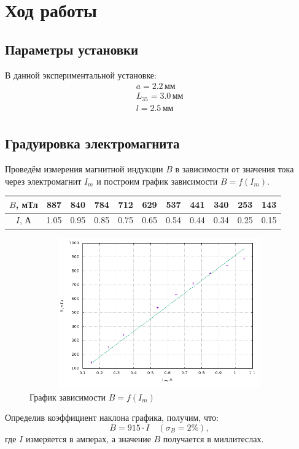 \documentclass[12pt]{article}
\begin{document}
\section*{Ход работы}
\subsection*{Параметры установки}
	В данной экспериментальной установке:
	\begin{align*}
		a = 2.2 \, \text{мм} \\
		L_\text{35} = 3.0 \, \text{мм} \\
		l = 2.5 \, \text{мм} \\ 
	\end{align*}
\subsection*{Градуировка электромагнита}
	Проведём измерения магнитной индукции $B$ в зависимости от значения тока через электромагнит $I_m$ и построим график зависимости $B = f(I_m)$.
\begin{table}[h!]
	\centering
	\begin{tabular}{|c|c|c|c|c|c|c|c|c|c|c|}
	\hline
	$B$, мТл & 887 & 840 & 784 & 712 & 629 & 537 & 441 & 340 & 253 & 143 \\
	\hline
	$I$, А & 1.05 & 0.95 & 0.85 & 0.75 & 0.65 & 0.54 & 0.44 & 0.34 & 0.25 & 0.15 \\
	\hline
	\end{tabular}
\end{table}
\newpage
\begin{figure}[h!]
	\centering
	\includegraphics[height = 6.5cm, width = 12cm]{plot1.png}
	\caption{График зависимости $B = f(I_m)$}
\end{figure}
	Определив коэффициент наклона графика, получим, что:
\[
	B = 915 \cdot I \quad \left(\sigma_B = 2 \% \right), 
\]	
где $I$ измеряется в амперах, а значение $B$ получается в миллитеслах.	
\end{document}
